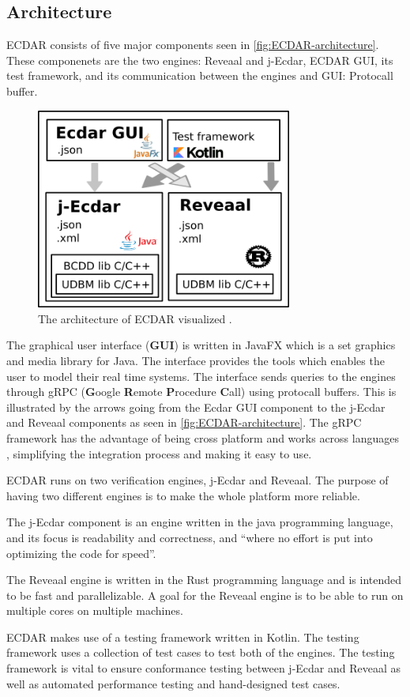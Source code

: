 \subsection{Architecture}\label{sub:architecture}
ECDAR consists of five major components seen in \autoref{fig:ECDAR-architecture}.
These componenets are the two engines: Reveaal and j-Ecdar, ECDAR GUI, its test framework, and its communication between the engines and GUI: Protocall buffer.
\begin{figure}[H]
    \centering
    \includegraphics[width=0.75\textwidth]{common/figures/ArchOverview.png}
    \caption{The architecture of ECDAR visualized \cite{ECDARNET}.}
    \label{fig:ECDAR-architecture}
\end{figure}
The graphical user interface (\textbf{GUI}) is written in JavaFX which is a set graphics and media library for Java. The interface provides the tools which enables the user to model their real time systems. The interface sends queries to the engines through gRPC (\textbf{G}oogle \textbf{R}emote \textbf{P}rocedure \textbf{C}all) using protocall buffers. This is illustrated by the arrows going from the Ecdar GUI component to the j-Ecdar and Reveaal components as seen in \autoref{fig:ECDAR-architecture}. The gRPC framework has the advantage of being cross platform and works across languages \cite{gRPC}, simplifying the integration process and making it easy to use.

ECDAR runs on two verification engines, j-Ecdar and Reveaal. The purpose of having two different engines is to make the whole platform more reliable.

The j-Ecdar component is an engine written in the java programming language, and its focus is readability and correctness, and ``where no effort is put into optimizing the code for speed''.\cite{ECDARNET}

The Reveaal engine is written in the Rust programming language and is intended to be fast and parallelizable. A goal for the Reveaal engine is to be able to run on multiple cores on multiple machines. 

ECDAR makes use of a testing framework written in Kotlin. 
The testing framework uses a collection of test cases to test both of the engines. 
The testing framework is vital to ensure conformance testing between j-Ecdar and Reveaal as well as automated performance testing and hand-designed test cases. 
